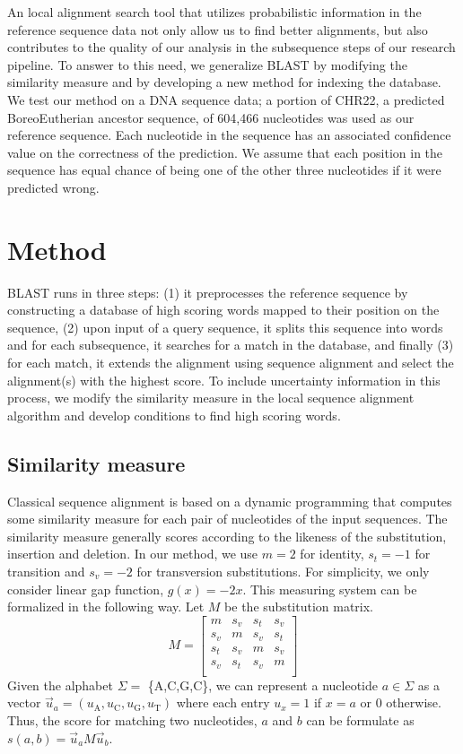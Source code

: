 \documentclass{article}
\begin{document}
An local alignment search tool that utilizes probabilistic information in the reference sequence data not only allow us to find better alignments, but also contributes to the quality of our analysis in the subsequence steps of our research pipeline. To answer to this need, we generalize BLAST by modifying the similarity measure and by developing a new method for indexing the database. We test our method on a DNA sequence data; a portion of CHR22, a predicted BoreoEutherian ancestor sequence, of 604,466 nucleotides was used as our reference sequence. Each nucleotide in the sequence has an associated confidence value on the correctness of the prediction. We assume that each position in the sequence has equal chance of being one of the other three nucleotides if it were predicted wrong. 

\section{Method}

BLAST runs in three steps: (1) it preprocesses the reference sequence by constructing a database of high scoring words mapped to their position on the sequence, (2) upon input of a query sequence, it splits this sequence into words and for each subsequence, it searches for a match in the database, and finally (3) for each match, it extends the alignment using sequence alignment and select the alignment(s) with the highest score. \cite{blast} To include uncertainty information in this process, we modify the similarity measure in the local sequence alignment algorithm and develop conditions to find high scoring words. 

\subsection{Similarity measure}

Classical sequence alignment is based on a dynamic programming that computes some similarity measure for each pair of nucleotides of the input sequences. \cite{blast} The similarity measure generally scores according to the likeness of the substitution, insertion and deletion. In our method, we use $m = 2$ for identity, $s_t = -1$ for transition and $s_v = -2$ for transversion substitutions. For simplicity, we only consider linear gap function, $g(x)=-2x$. This measuring system can be formalized in the following way. Let $M$ be the substitution matrix. 
\begin{equation}
	M = \begin{bmatrix}
		m & s_v & s_t & s_v\\
		s_v & m & s_v & s_t\\
		s_t & s_v & m & s_v\\
		s_v & s_t & s_v & m\\
	\end{bmatrix}
\end{equation}
Given the alphabet $\Sigma =$ \{A,C,G,C\}, we can represent a nucleotide $a \in \Sigma$ as a vector $\vec{u}_a = (u_{\mbox{A}}, u_{\mbox{C}}, u_{\mbox{G}}, u_{\mbox{T}})$ where each entry $u_x = 1$ if $x = a$ or 0 otherwise. Thus, the score for matching two nucleotides, $a$ and $b$ can be formulate as $s(a,b) = \vec{u}_aM\vec{u}_b$.
\end{document}
